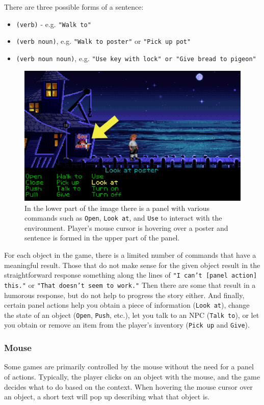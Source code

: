 There are three possible forms of a sentence:
\begin{itemize}
    \item \verb|(verb)| - e.g. \texttt{"Walk to"}
    \item \verb|(verb noun)|, e.g. \texttt{"Walk to poster"} or \texttt{"Pick up pot"}
    \item \verb|(verb noun noun)|, e.g. \texttt{\texttt{"Use key with lock"} or "Give bread to pigeon"}
\end{itemize}
 
\begin{figure}[H]
\centering
\includegraphics[width=.8\linewidth]{img/C-TSoMI.png}
\caption{In the lower part of the image there is a panel with various commands such as \texttt{Open}, \texttt{Look at}, and \texttt{Use} to interact with the environment. Player's mouse cursor is hovering over a poster and sentence is formed in the upper part of the panel.}
\label{fig:C-TSoMI}
\end{figure}

For each object in the game, there is a limited number of commands that have a meaningful result. Those that do not make sense for the given object result in the straightforward response something along the lines of \texttt{"I can't [panel action] this."} or \texttt{"That doesn't seem to work."} Then there are some that result in a humorous response, but do not help to progress the story either. And finally, certain panel actions help you obtain a piece of information (\texttt{Look at}), change the state of an object (\texttt{Open}, \texttt{Push}, etc.), let you talk to an NPC (\texttt{Talk to}), or let you obtain or remove an item from the player's inventory (\texttt{Pick up} and \texttt{Give}).

\subsubsection{Mouse}
Some games are primarily controlled by the mouse without the need for a panel of actions. Typically, the player clicks on an object with the mouse, and the game decides what to do based on the context. When hovering the mouse cursor over an object, a short text will pop up describing what that object is.

